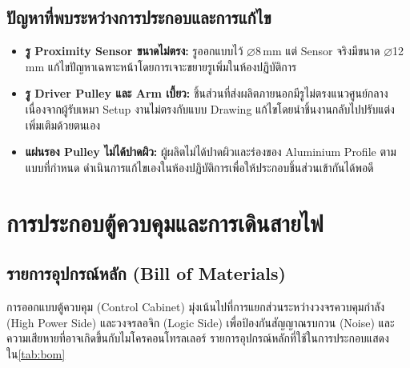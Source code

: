 \subsection{ปัญหาที่พบระหว่างการประกอบและการแก้ไข}
\label{subsec:assembly_issues}

\begin{itemize}
  \item \textbf{รู Proximity Sensor ขนาดไม่ตรง:} รูออกแบบไว้ $\varnothing$8\,mm แต่ Sensor จริงมีขนาด $\varnothing$12\,mm แก้ไขปัญหาเฉพาะหน้าโดยการเจาะขยายรูเพิ่มในห้องปฏิบัติการ
  \item \textbf{รู Driver Pulley และ Arm เบี้ยว:} ชิ้นส่วนที่ส่งผลิตภายนอกมีรูไม่ตรงแนวศูนย์กลาง เนื่องจากผู้รับเหมา Setup งานไม่ตรงกับแบบ Drawing แก้ไขโดยนำชิ้นงานกลับไปปรับแต่งเพิ่มเติมด้วยตนเอง
  \item \textbf{แผ่นรอง Pulley ไม่ได้ปาดผิว:} ผู้ผลิตไม่ได้ปาดผิวและร่องของ Aluminium Profile ตามแบบที่กำหนด ดำเนินการแก้ไขเองในห้องปฏิบัติการเพื่อให้ประกอบชิ้นส่วนเข้ากันได้พอดี
\end{itemize}

\section{การประกอบตู้ควบคุมและการเดินสายไฟ}
\label{sec:elec_assembly}

\subsection{รายการอุปกรณ์หลัก (Bill of Materials)}
\label{subsec:bom}

การออกแบบตู้ควบคุม (Control Cabinet) มุ่งเน้นไปที่การแยกส่วนระหว่างวงจรควบคุมกำลัง (High Power Side) และวงจรลอจิก (Logic Side) เพื่อป้องกันสัญญาณรบกวน (Noise) และความเสียหายที่อาจเกิดขึ้นกับไมโครคอนโทรลเลอร์ รายการอุปกรณ์หลักที่ใช้ในการประกอบแสดงใน\cref{tab:bom}

